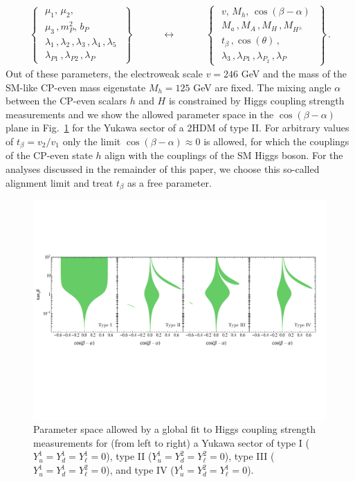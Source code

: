 \begin{align}
\left\{ \,\,\begin{matrix}
\mu_1,\,\mu_2,\\[3pt]
\mu_3\,, m_P^2,\, b_P\\[3pt]
\lambda_1\,,\lambda_2\,,\lambda_3\,,\lambda_4\,,\lambda_5\\
\lambda_{P1}\,,\lambda_{P2} \,, \lambda_P
\end{matrix}\,\,\right\}\qquad \quad \longleftrightarrow \quad \qquad \left\{ \,\,\begin{matrix}
v,\, M_h,\,\cos(\beta-\alpha)\\[3pt]
M_a\,, M_A\,, M_H\,,M_{H^\pm}\\[3pt]
t_\beta\,, \cos(\theta)\,, \\[3pt]
\lambda_3\,,\lambda_{P1}\,,\lambda_{P_2}\,,\lambda_P
\end{matrix}\,\,\right\}\,.
\end{align}
Out of these parameters, the electroweak scale $v=246$ GeV and the mass of the SM-like CP-even mass eigenstate $M_h=125$ GeV are fixed. The mixing angle $\alpha$ between the CP-even scalars $h$ and $H$ is constrained by Higgs coupling strength measurements \cite{} and we show the allowed parameter space in the $\cos(\beta-\alpha)$ plane in  Fig.~\ref{fig:higgsfit} for the Yukawa sector of a 2HDM of type II.  For arbitrary values of $t_\beta=v_2/v_1$ only the limit $\cos(\beta-\alpha)\approx 0$ is allowed, for which the couplings of the CP-even state $h$ align with the couplings of the SM Higgs boson. For the analyses discussed in the remainder of this paper, we choose this so-called alignment limit and treat $t_\beta$ as a free parameter.
\begin{figure}[t]
\includegraphics[width=\textwidth]{texinputs/03_theoparameters/Figs/Higgsfit}
\caption{\label{fig:higgsfit} Parameter space allowed by a global fit to Higgs coupling strength measurements for (from left to right) a Yukawa sector of type I ($Y_u^1  = Y_d^1 = Y_\ell^1 =0$), type II ($Y_u^1 = Y_d^2 = Y_\ell^2 =0$),  type III ($Y_u^1 = Y_d^1 = Y_\ell^2 =0$), and type IV ($Y_u^1  = Y_d^2 = Y_\ell^1 =0$). }
\end{figure}
